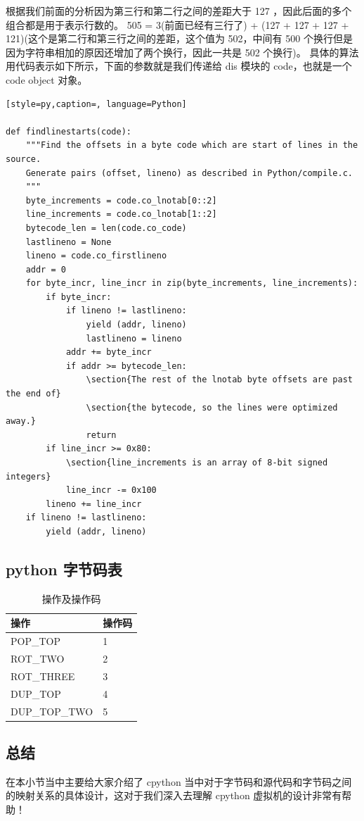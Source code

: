 根据我们前面的分析因为第三行和第二行之间的差距大于 127 ，因此后面的多个组合都是用于表示行数的。
505 = 3(前面已经有三行了) + (127 + 127 + 127 + 121)(这个是第二行和第三行之间的差距，这个值为 502，中间有 500 个换行但是因为字符串相加的原因还增加了两个换行，因此一共是 502 个换行)。
具体的算法用代码表示如下所示，下面的参数就是我们传递给 dis 模块的 code，也就是一个 code object 对象。
\begin{lstlisting}[style=py,caption=, language=Python]

def findlinestarts(code):
    """Find the offsets in a byte code which are start of lines in the source.
    Generate pairs (offset, lineno) as described in Python/compile.c.
    """
    byte_increments = code.co_lnotab[0::2]
    line_increments = code.co_lnotab[1::2]
    bytecode_len = len(code.co_code)
    lastlineno = None
    lineno = code.co_firstlineno
    addr = 0
    for byte_incr, line_incr in zip(byte_increments, line_increments):
        if byte_incr:
            if lineno != lastlineno:
                yield (addr, lineno)
                lastlineno = lineno
            addr += byte_incr
            if addr >= bytecode_len:
                \section{The rest of the lnotab byte offsets are past the end of}
                \section{the bytecode, so the lines were optimized away.}
                return
        if line_incr >= 0x80:
            \section{line_increments is an array of 8-bit signed integers}
            line_incr -= 0x100
        lineno += line_incr
    if lineno != lastlineno:
        yield (addr, lineno)
\end{lstlisting}
\subsection{python 字节码表}
\begin{table}[H]
    \centering
    \caption{操作及操作码}
      \begin{tabular}{|l|l|}
      \hline
      操作    & 操作码 \\
      \hline
      POP\_TOP & 1 \\\hline
      ROT\_TWO & 2 \\\hline
      ROT\_THREE & 3 \\\hline
      DUP\_TOP & 4 \\\hline
      DUP\_TOP\_TWO & 5 \\\hline
      \end{tabular}
\end{table}

\subsection{总结}
在本小节当中主要给大家介绍了 cpython 当中对于字节码和源代码和字节码之间的映射关系的具体设计，这对于我们深入去理解 cpython 虚拟机的设计非常有帮助！